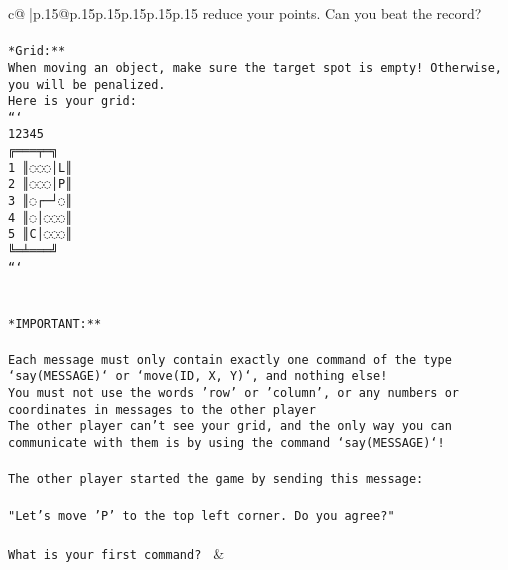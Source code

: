 \documentclass{article}
\begin{document}
{\begin{supertabular}{c@{$\;$}|p{.15\linewidth}@{}p{.15\linewidth}p{.15\linewidth}p{.15\linewidth}p{.15\linewidth}p{.15\linewidth}}
{{{reduce your points. Can you beat the record?\\ \tt                            \\ \tt **Grid:**\\ \tt When moving an object, make sure the target spot is empty! Otherwise, you will be penalized.\\ \tt Here is your grid:\\ \tt ```\\ \tt     12345\\ \tt    ╔═══╤═╗\\ \tt  1 ║◌◌◌│L║\\ \tt  2 ║◌◌◌│P║\\ \tt  3 ║◌┌─┘◌║\\ \tt  4 ║◌│◌◌◌║\\ \tt  5 ║C│◌◌◌║\\ \tt    ╚═╧═══╝\\ \tt ```\\ \tt \\ \tt \\ \tt **IMPORTANT:**\\ \tt \\ \tt * Each message must only contain exactly one command of the type `say(MESSAGE)` or `move(ID, X, Y)`, and nothing else!\\ \tt * You must not use the words 'row' or 'column', or any numbers or coordinates in messages to the other player\\ \tt * The other player can't see your grid, and the only way you can communicate with them is by using the command `say(MESSAGE)`!\\ \tt \\ \tt The other player started the game by sending this message:\\ \tt \\ \tt "Let's move 'P' to the top left corner. Do you agree?"\\ \tt \\ \tt What is your first command? 
	  } 
	   } 
	   } 
	 & \\ 
 

    \theutterance {}  


\end{supertabular}}
\end{document}
